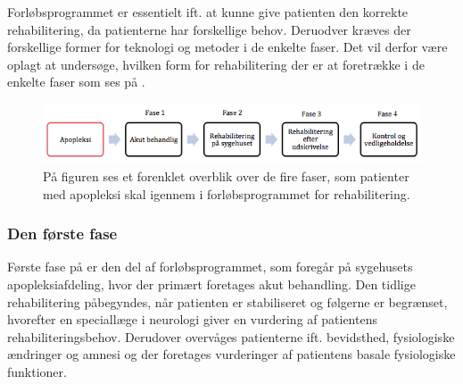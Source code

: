 Forløbsprogrammet er essentielt ift. at kunne give patienten den korrekte rehabilitering, da patienterne har forskellige behov. Deruodver kræves der forskellige former for teknologi og metoder i de enkelte faser. Det vil derfor være oplagt at undersøge, hvilken form for rehabilitering der er at foretrække i de enkelte faser som ses på .

\begin{figure}[H]
	\centering
	\includegraphics[scale=1.2]{figures/bProblemanalyse/flowdiagram_faser1.png}
	\caption{På figuren ses et forenklet overblik over de fire faser, som patienter med apopleksi skal igennem i forløbsprogrammet for rehabilitering. \cite{Sundhedsstyrelsen2011a}} 
	\label{firefaser}
\end{figure}

\subsubsection{Den første fase}
Første fase på  er den del af forløbsprogrammet, som foregår på sygehusets apopleksiafdeling, hvor der primært foretages akut behandling. Den tidlige rehabilitering påbegyndes, når patienten er stabiliseret og følgerne er begrænset, hvorefter en speciallæge i neurologi giver en vurdering af patientens rehabiliteringsbehov. Derudover overvåges patienterne ift. bevidsthed, fysiologiske ændringer og amnesi og der foretages vurderinger af patientens basale fysiologiske funktioner. %

